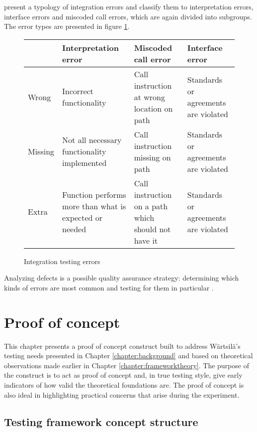 \documentclass[12pt,a4paper,oneside,pdftex]{report}
\begin{document}
{{\citet{leung1990study} present a typology of integration errors and classify them to interpretation errors, interface errors and miscoded call errors, which are again divided into subgroups.  The error types are presented in figure \ref{fig:errors}.

\begin{figure}[H]
\begin{center}
    \begin{tabular}{ l || >{\raggedright}p{3cm} | >{\raggedright}p{3cm} | >{\raggedright\arraybackslash}p{3cm} }
      & Interpretation error & Miscoded call error & Interface error \\ \hline \hline
    Wrong & Incorrect functionality & Call instruction at wrong location on path & Standards or agreements are violated \\ \hline
    Missing & Not all necessary functionality implemented & Call instruction missing on path & Standards or agreements are violated \\ 
    \hline
    Extra & Function performs more than what is expected or needed & Call instruction on a path which should not have it & Standards or agreements are violated \\
    \end{tabular}
\end{center}
\caption{Integration testing errors \citep{leung1990study}} \label{fig:errors}
\end{figure}

Analyzing defects is a possible quality assurance strategy: determining which kinds of errors are most common and testing for them in particular \citep{pezze2008software}. %

\chapter{Proof of concept}
\label{chapter:poc}

This chapter presents a proof of concept construct built to address Wärtsilä's testing needs presented in Chapter \ref{chapter:background} and based on theoretical observations made earlier in Chapter \ref{chapter:frameworktheory}. The purpose of the construct is to act as proof of concept and, in true testing style, give early indicators of how valid the theoretical foundations are. The proof of concept is also ideal in highlighting practical concerns that arise during the experiment.

\section{Testing framework concept structure}

}}
\end{document}
